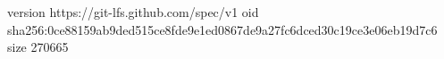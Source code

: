 version https://git-lfs.github.com/spec/v1
oid sha256:0ce88159ab9ded515ce8fde9e1ed0867de9a27fc6dced30c19ce3e06eb19d7c6
size 270665
